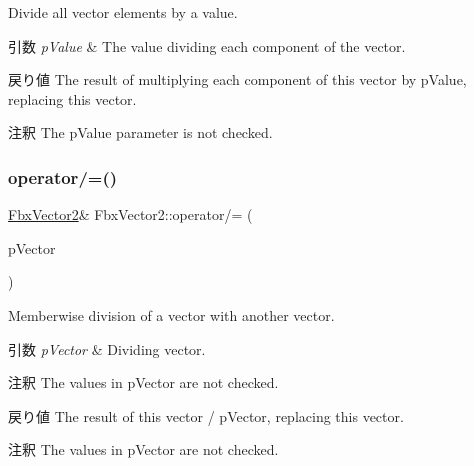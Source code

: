 Divide all vector elements by a value. 
\begin{DoxyParams}{引数}
{\em p\+Value} & The value dividing each component of the vector. \\
\hline
\end{DoxyParams}
\begin{DoxyReturn}{戻り値}
The result of multiplying each component of this vector by p\+Value, replacing this vector. 
\end{DoxyReturn}
\begin{DoxyRemark}{注釈}
The p\+Value parameter is not checked. 
\end{DoxyRemark}
\mbox{\label{class_fbx_vector2_ab5cb65076098583d38293fd01311decb}} 
\subsubsection{\texorpdfstring{operator/=()}{operator/=()}\hspace{0.1cm}{\footnotesize\ttfamily [2/2]}}
{\footnotesize\ttfamily \hyperlink{class_fbx_vector2}{Fbx\+Vector2}\& Fbx\+Vector2\+::operator/= (\begin{DoxyParamCaption}\item[{const \hyperlink{class_fbx_vector2}{Fbx\+Vector2} \&}]{p\+Vector }\end{DoxyParamCaption})}

Memberwise division of a vector with another vector. 
\begin{DoxyParams}{引数}
{\em p\+Vector} & Dividing vector. \\
\hline
\end{DoxyParams}
\begin{DoxyRemark}{注釈}
The values in p\+Vector are not checked. 
\end{DoxyRemark}
\begin{DoxyReturn}{戻り値}
The result of this vector / p\+Vector, replacing this vector. 
\end{DoxyReturn}
\begin{DoxyRemark}{注釈}
The values in p\+Vector are not checked. 
\end{DoxyRemark}
\mbox{\label{class_fbx_vector2_a1133cfe1028a4e62ce6dceb579fd8450}} 
